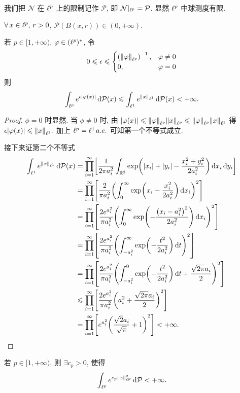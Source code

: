 我们把 $\mathcal{N}$ 在 $\ell^p$ 上的限制记作 $\mathcal{P}$, 即 $\mathcal{N}|_{\ell^p}=\mathcal{P}$. 显然 $\ell^p$ 中球测度有限.
\begin{lemma}
$\forall x\in\lp,\,r>0$, $\mathcal{P}(B(x,r))\in(0,+\infty)$.
\end{lemma}
\begin{theorem}
若 $p\in[1,+\infty)$, $\varphi\in(\ell^p)^*$, 令
$$ 0\leqslant\epsilon\leqslant
\begin{cases}
\left(\left\Vert\varphi\right\Vert_{\ell^p}\right)^{-1},& \varphi\neq0\\
0, & \varphi=0
\end{cases}
$$
则
$$
\int_{\ell^p}e^{\epsilon|\varphi(x)|}\,\mathrm{d}\mathcal{P}(x)\leqslant\int_{\ell^1}e^{\left\Vert x\right\Vert_{\ell^1}}\,\mathrm{d}\mathcal{P}(x)<+\infty.
$$
\end{theorem}
\begin{proof}
$\phi=0$ 时显然. 当 $\phi\neq0$ 时, 由
$|\phi(x)|\leq\fs{\phi}_{\lp}\fs{x}_{\lp}\leq\fs{\phi}_{\lp}\fs{x}_{\ell^1}$ 得 $\epsilon|\phi(x)|\leq\fs{x}_{\ell^1}.$ 加上 $\ell^p=\ell^1\, a.e.$ 可知第一个不等式成立.\par
接下来证第二个不等式
\begin{align*}
\int_{\ell^1}e^{\fs{x}_{\ell^1}}\dd\PP\xk{x} &= \prod_{i=1}^{\infty}\zk{\frac{1}{2\pi a_i^2}\int_{\rr^2}\exp\xk{\jd{x_i}+\jd{y_i}-\frac{x_i^2+y_i^2}{2a_i^2}}\dd x_i\dd y_i}\\
&= \prod_{i=1}^{\infty}\zk{\frac{2}{\pi a_{i}^{2}}\xk{\int_0^\infty\exp\xk{x_i-\frac{x_i^2}{2a_i^2}}\dd x_i}^2}\\
&= \prod_{i=1}^{\infty}\zk{\frac{2e^{a_i^2}}{\pi a_{i}^{2}}\xk{\int_0^\infty\exp\xk{-\frac{\xk{x_i-a_i^2}^2}{2a_i^2}}\dd x_i}^2}\\
&= \prod_{i=1}^{\infty}\zk{\frac{2e^{a_i^2}}{\pi a_{i}^{2}}\xk{\int_{-a_i^2}^{\infty}\exp\xk{-\frac{t^2}{2a_i^2}}\dd t}^{2}}\\
&= \prod_{i=1}^{\infty}\zk{\frac{2e^{a_i^2}}{\pi a_{i}^{2}}\xk{\int_{-a_i^2}^{0}\exp\xk{-\frac{t^2}{2a_i^2}}\dd t+\frac{\sqrt{2\pi}a_i}{2}}^2}\\
&\leq \prod_{i=1}^{\infty}\zk{\frac{2e^{a_i^2}}{\pi a_{i}^{2}}\xk{a_i^2+\frac{\sqrt{2\pi}a_i}{2}}^2}\\
&= \prod_{i=1}^{\infty}\zk{e^{a_{i}^{2}}\xk{\frac{\sqrt{2}a_{i}}{\sqrt{\pi}}+1}^2}<+\infty.\qedhere
\end{align*}
\end{proof}
\begin{corollary}
若 $p\in[1,+\infty)$, 则 $\exists c_{p}>0$, 使得
\[\int_{\ell^p}e^{c_{p}\left\Vert z\right\Vert_{\ell^p}^{2}}\,\mathrm{d}\mathcal{P}<+\infty.\]
\end{corollary}
